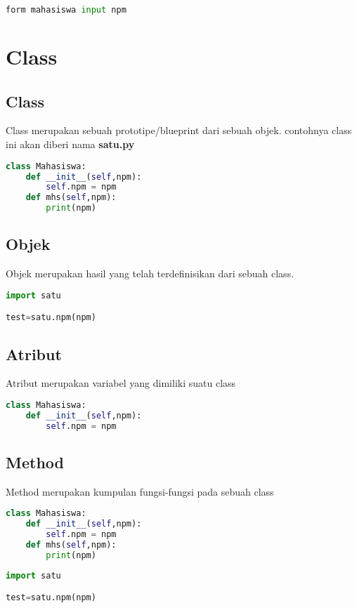 \begin{lstlisting}[language=Python]
form mahasiswa input npm
\end{lstlisting}

\section{Class}
\subsection{Class}
Class merupakan sebuah prototipe/blueprint dari sebuah objek. contohnya class ini akan diberi nama \textbf{satu.py}

\begin{lstlisting}[language=Python]
class Mahasiswa:
	def __init__(self,npm):
		self.npm = npm
	def mhs(self,npm):
		print(npm)
\end{lstlisting}


\subsection{Objek}
Objek merupakan hasil yang telah terdefinisikan dari sebuah class.

\begin{lstlisting}[language=Python]
import satu

test=satu.npm(npm)
\end{lstlisting}

\subsection{Atribut}
Atribut merupakan variabel yang dimiliki suatu class

\begin{lstlisting}[language=Python]
class Mahasiswa:
	def __init__(self,npm):
		self.npm = npm
\end{lstlisting}

\subsection{Method}
Method merupakan kumpulan fungsi-fungsi pada sebuah class

\begin{lstlisting}[language=Python]
class Mahasiswa:
	def __init__(self,npm):
		self.npm = npm
	def mhs(self,npm):
		print(npm)
\end{lstlisting}


\begin{lstlisting}[language=Python]
import satu

test=satu.npm(npm)
\end{lstlisting}

